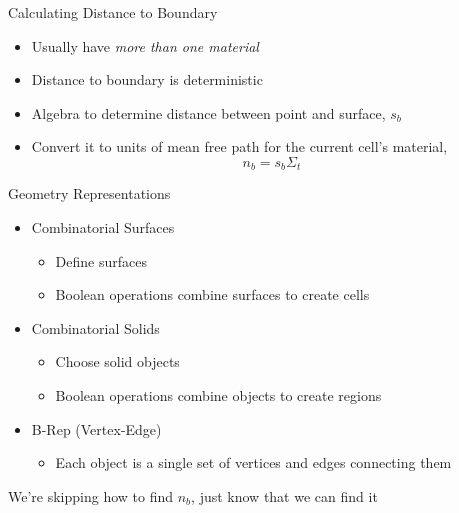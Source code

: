 \documentclass[xcolor=x11names,compress]{beamer}
\renewcommand{\(}{\begin{columns}}
\renewcommand{\)}{\end{columns}}
\newcommand{\<}[1]{\begin{column}{#1}}
\renewcommand{\>}{\end{column}}
\begin{document}
\begin{frame}{Calculating Distance to Boundary}

\begin{itemize}
  \item Usually have \textit{more than one material}
  \vspace*{1 em}
  \item Distance to boundary is deterministic
  \vspace*{1 em}
  \item Algebra to determine distance between point and surface, $s_b$
  \vspace*{1 em}
  \item Convert it to units of mean free path for the current cell's material, 
  \[n_b = s_b \Sigma_t\] 
\end{itemize}

\end{frame}


\begin{frame}{Geometry Representations}

\begin{itemize}
  \item Combinatorial Surfaces
  \begin{itemize}
    \item Define surfaces
    \item Boolean operations combine surfaces to create cells
  \end{itemize}
  \vspace*{1 em}
  \item Combinatorial Solids
  \begin{itemize}
    \item Choose solid objects
    \item Boolean operations combine objects to create regions
  \end{itemize}
  \vspace*{1 em}
  \item B-Rep (Vertex-Edge)
  \begin{itemize}
    \item Each object is a single set of vertices and edges connecting them
  \end{itemize}
\end{itemize}
\vspace*{1 em}
We're skipping how to find $n_b$, just know that we can find it

\end{frame}
\end{document}
